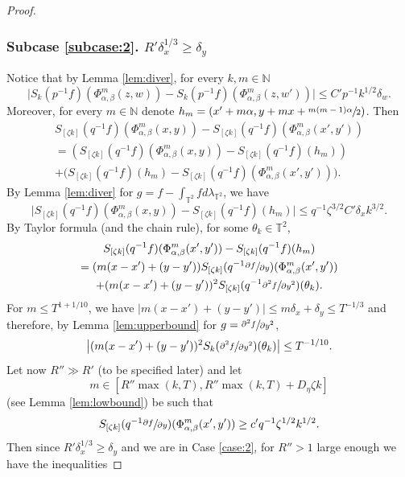 \documentclass[10pt]{amsart}
\newcounter{case}
\newcounter{subcase}
\theoremstyle{definition}
\theoremstyle{plain}
\newcommand\NN{\mathbb{N}}
\newcommand\TT{\mathbb{T}}
\begin{document}
\begin{proof}
\subsubsection*{Subcase \ref{subcase:2}. $R'\delta_x^{1/3}\geq \delta_y$}
Notice that by Lemma \ref{lem:diver}, for every $k, m\in \NN$
\begin{equation}\label{eq:02}
\bigl|S_k(p^{-1}f)(\Phi_{\alpha,\beta}^m(z,w))-S_k(p^{-1}f)(\Phi_{\alpha,\beta}^m(z,w'))\bigr|\leq C'p^{-1}k^{1/2}\delta_w.
\end{equation}
Moreover, for every $m\in \NN$ denote $h_m=(x'+m\alpha, y+mx+\sfrac{m(m-1)\alpha}{2})$. Then
\begin{multline}\label{sar:split2}
S_{[\zeta k]}(q^{-1}f)(\Phi_{\alpha,\beta}^m(x,y))-S_{[\zeta k]}(q^{-1}f)
(\Phi_{\alpha,\beta}^m(x',y'))\\ =
\left(S_{[\zeta k]}(q^{-1}f)(\Phi_{\alpha,\beta}^m(x,y))-S_{[\zeta k]}(q^{-1}f)(h_m)\right)\\ +
\bigl(S_{[\zeta k]}(q^{-1}f)(h_m)-S_{[\zeta k]}(q^{-1}f)(\Phi_{\alpha,\beta}^m(x',y'))\bigr).
\end{multline}
By Lemma \ref{lem:diver} for $g=f-\int_{\TT^2} f d\lambda_{\TT^2}$, we have
\begin{equation}\label{eq:01}
\bigl|S_{[\zeta k]}(q^{-1}f)(\Phi_{\alpha,\beta}^m(x,y))-S_{[\zeta k]}(q^{-1}f)(h_m)\bigr|\leq q^{-1}\zeta^{3/2}C' \delta_x k^{3/2}.
\end{equation}
By Taylor formula (and the chain rule), for some $\theta_k\in \TT^2$,
\begin{multline}\label{eq:sply}
S_{[\zeta k]}(q^{-1}f)(\Phi_{\alpha,\beta}^m(x',y'))-S_{[\zeta k]}(q^{-1}f)(h_m) \\
=(m(x-x')+(y-y'))S_{[\zeta k]}(q^{-1}\sfrac{\partial f}{\partial y})(\Phi_{\alpha,\beta}^m(x',y'))\\
+(m(x-x')+(y-y'))^2 S_{[\zeta k]}(q^{-1}\sfrac{\partial^2 f}{\partial y^2})(\theta_k).
\end{multline}
For $m\leq T^{1+1/10}$, we have $\vert m(x-x')+(y-y')\vert \leq m\delta_x +\delta_y \leq T^{-1/3}$ and therefore, by Lemma \ref{lem:upperbound} for $g=\sfrac{\partial^2 f}{\partial y^2}$,
\[
\bigl|(m(x-x')+(y-y'))^2
S_k(\sfrac{\partial^2 f}{\partial y^2})(\theta_k)\bigr|\leq T^{-1/10}.
\]
Let now $R''\gg R'$ (to be specified later) and let
\[
m\in [R''\max(k,T ),R''\max(k,T)+D_\eta \zeta k]
\]
(see Lemma \ref{lem:lowbound}) be such that
\[
S_{[\zeta k]}(q^{-1}\sfrac{\partial f}{\partial y})(\Phi_{\alpha,\beta}^m(x',y'))\geq c'q^{-1}\zeta^{1/2} k^{1/2}.
\]
Then since $R'\delta_x^{1/3}\geq \delta_y$ and we are in Case \ref{case:2}, for $R''>1$ large enough we have the inequalities

\end{proof}
\end{document}

